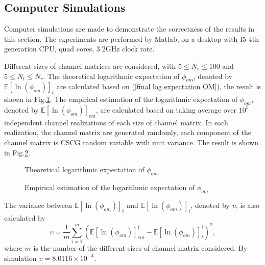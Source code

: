 \documentclass[12pt, draftclsnofoot, onecolumn]{IEEEtran}
\begin{document}
\subsection{Computer Simulations}
Computer simulations are made to demonstrate the correctness of the results in this section. The experiments are performed by Matlab, on a desktop with I5-4th generation CPU, quad cores, 3.2GHz clock rate.

Different sizes of channel matrices are considered, with $5\leq N_{r}\leq 100$ and $5\leq N_{t}\leq N_{r}$. The theoretical logarithmic expectation of $\phi_{om}$, denoted by $\mathbb{E}[\ln(\phi_{om})]_{t}$ are calculated based on (\ref{final log expectation OM}), the result is shown in Fig.\ref{flogOMt}. The empirical estimation of the logarithmic expectation of $\phi_{om}$, denoted by $\mathbb{E}[\ln(\phi_{om})]_{em}$, are calculated based on taking average over $10^{5}$ independent channel realizations of each size of channel matrix. In each realization, the channel matrix are generated randomly, each component of the channel matrix is CSCG random variable with unit variance. The result is shown in Fig.\ref{flogOMem}. 
\begin{figure}[htb]
\centering
\def\svgwidth{\columnwidth}

\caption{Theoretical logarithmic expectation of $\phi_{om}$}
\label{flogOMt}
\end{figure}

\begin{figure}[htb]
\centering
\def\svgwidth{\columnwidth}

\caption{Empirical estimation of the logarithmic expectation of $\phi_{om}$}
\label{flogOMem}
\end{figure}

The variance between $\mathbb{E}[\ln(\phi_{om})]_{t}$ and $\mathbb{E}[\ln(\phi_{om})]_{t}$, denoted by $\upsilon$, is also calculated by \begin{equation}
\upsilon=\frac{1}{m}\sum_{i=1}^{m}(\mathbb{E}[\ln(\phi_{om})]^{i}_{em}-\mathbb{E}[\ln(\phi_{om})]^{i}_{t})^{2},
\label{variance OM}
\end{equation} 
where $m$ is the number of the different sizes of channel matrix considered. By simulation $\upsilon=8.0116\times 10^{-4}$.
\end{document}
